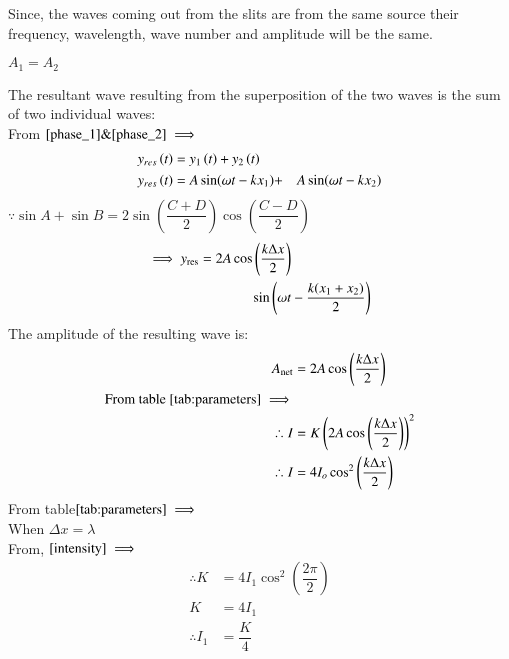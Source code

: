 \documentclass[journal,12pt,twocolumn]{IEEEtran}
\theoremstyle{remark}
\begin{document}
\hspace*{0.8cm} Since, the waves coming out from the slits are from the same source their frequency, wavelength, wave number and amplitude will be the same. 
\begin{center}
    $A_1 = A_2$ \\
\end{center} 
The resultant wave resulting from the superposition of the two waves is the sum of two individual waves: \\
From $\eqref{phase_1} \& \eqref{phase_2} \implies$
\begin{align}
y_{res}\left(t\right) &= y_1\left(t\right) + y_2\left(t\right)  \\
y_{res}\left(t\right) &= A\sin({\omega t - kx_1})  + &A\sin({ \omega t - kx_2}) \nonumber 
\end{align}
 $ \because \sin{A} + \sin{B} = 2\sin\left(\dfrac{C+D}{2}\right) \cos\left(\dfrac{C-D}{2}\right) $ 
\begin{align}
 \implies y_\text{res} =  2A\cos\left(\dfrac{k\Delta x}{2}\right) \nonumber \hspace*{2cm} \\ \quad \sin\left(\omega t - \dfrac{k(x_1+x_2)}{2} \right) 
 \end{align}
The amplitude of the resulting wave is: 
\begin{align}
A_\text{net} &= 2A\cos\left(\dfrac{k\Delta x}{2}\right)  \\ 
\text{From table }\eqref{tab:parameters} \implies \nonumber \\
\therefore I &= K\left(2A\cos\left(\dfrac{k\Delta x}{2}\right)\right)^2 \nonumber\\
\therefore I &= 4I_o\cos^2\left(\dfrac{k\Delta x}{2}\right)  \label{intensity}
\end{align}
From table$ \eqref{tab:parameters} \implies$ \\
 \hspace*{1.8cm}When $\Delta x = \lambda$ \\
From, $\eqref{intensity} \implies$
\begin{align}
   \therefore K &= 4I_1\cos^2\left(\dfrac{2\pi}{2}\right) \nonumber \\
    K &= 4I_1 \nonumber \\
 \therefore    I_1&=\dfrac{K}{4} \label{eq}
\end{align}
\end{document}
